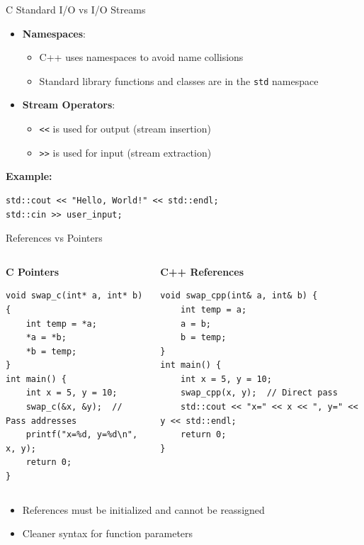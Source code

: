 \begin{frame}[fragile]{ C Standard I/O vs I/O Streams}
    \begin{itemize}
        \item \textbf{Namespaces}:
            \begin{itemize}
                \item C++ uses namespaces to avoid name collisions
                \item Standard library functions and classes are in the \texttt{std} namespace
            \end{itemize}
        \item \textbf{Stream Operators}:
            \begin{itemize}
                \item \texttt{<<} is used for output (stream insertion)
                \item \texttt{>>} is used for input (stream extraction)
            \end{itemize}
    \end{itemize}
    \vspace{0.5em}
    \textbf{Example:}
    \begin{verbatim}
std::cout << "Hello, World!" << std::endl;
std::cin >> user_input;
    \end{verbatim}
\end{frame}


\begin{frame}[fragile]{ References vs Pointers}
	\begin{columns}
		\begin{column}{0.5\textwidth}
			\textbf{C Pointers}
			\begin{verbatim}
void swap_c(int* a, int* b) {
    int temp = *a;
    *a = *b;
    *b = temp;
}
int main() {
    int x = 5, y = 10;
    swap_c(&x, &y);  // Pass addresses
    printf("x=%d, y=%d\n", x, y);
    return 0;
}
			\end{verbatim}
		\end{column}
		\begin{column}{0.5\textwidth}
			\textbf{C++ References}
			\begin{verbatim}
void swap_cpp(int& a, int& b) {
    int temp = a;
    a = b;
    b = temp;
}
int main() {
    int x = 5, y = 10;
    swap_cpp(x, y);  // Direct pass
    std::cout << "x=" << x << ", y=" << y << std::endl;
    return 0;
}
			\end{verbatim}
		\end{column}
	\end{columns}

	\vspace{0.5em}
	\begin{itemize}
		\item References must be initialized and cannot be reassigned
		\item Cleaner syntax for function parameters
	\end{itemize}
\end{frame}

